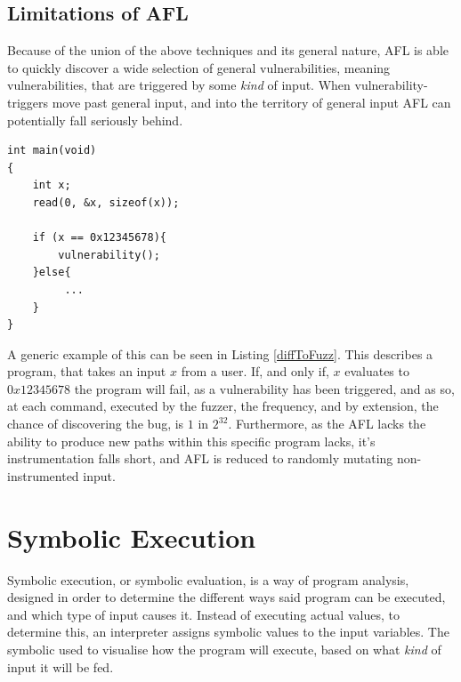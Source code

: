 \documentclass[a4paper]{article}
\newcommand{\tit}[1]{\textit{#1}}
\begin{document}
\subsection{Limitations of AFL}
\label{sec:LimitsAFL}
Because of the union of the above techniques and its general nature, AFL is able to quickly discover a wide selection of general vulnerabilities, meaning vulnerabilities, that are triggered by some \tit{kind} of input. When vulnerability-triggers move past general input, and into the territory of general input AFL can potentially fall seriously behind.
\begin{lstlisting}[caption=A program that is difficult to fuzz, label=diffToFuzz, captionpos=b]
int main(void)
{
    int x;
    read(0, &x, sizeof(x));
    
    if (x == 0x12345678){
        vulnerability();
    }else{
         ...
    }
}
\end{lstlisting}
A generic example of this can be seen in Listing \ref{diffToFuzz}. This describes a program, that takes an input $x$ from a user. If, and only if, $x$ evaluates to $0x12345678$ the program will fail, as a vulnerability has been triggered, and as so, at each command, executed by the fuzzer, the frequency, and by extension, the chance of discovering the bug, is $1$ in $2^{32}$. Furthermore, as the AFL lacks the ability to produce new paths within this specific program lacks, it's instrumentation falls short, and AFL is reduced to randomly mutating non-instrumented input.
\section{Symbolic Execution}
\label{sec:SymEx}
Symbolic execution, or symbolic evaluation, is a way of program analysis, designed in order to determine the different ways said program can be executed, and which type of input causes it. Instead of executing actual values, to determine this, an interpreter assigns symbolic values to the input variables. The symbolic used to visualise how the program will execute, based on what \tit{kind} of input it will be fed.
\end{document}
